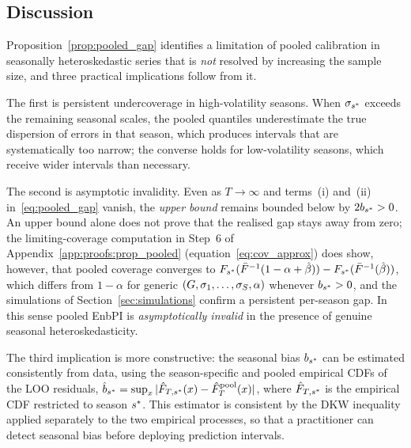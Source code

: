 \subsection{Discussion}
\label{sec:pooled_gap:discussion}

Proposition~\ref{prop:pooled_gap} identifies a limitation of pooled
calibration in seasonally heteroskedastic series that is \emph{not}
resolved by increasing the sample size, and three practical
implications follow from it.

The first is persistent undercoverage in high-volatility seasons.
When $\sigma_{s^*}$ exceeds the remaining seasonal scales, the
pooled quantiles underestimate the true dispersion of errors in that
season, which produces intervals that are systematically too narrow;
the converse holds for low-volatility seasons, which receive wider
intervals than necessary.

The second is asymptotic invalidity.  Even as $T \to \infty$ and
terms~(i) and~(ii) in~\eqref{eq:pooled_gap} vanish, the \emph{upper
bound} remains bounded below by $2b_{s^*} > 0$.  An upper bound alone
does not prove that the realised gap stays away from zero; the
limiting-coverage computation in Step~6 of
Appendix~\ref{app:proofs:prop_pooled}
(equation~\eqref{eq:cov_approx}) does show, however, that pooled
coverage converges to
$F_{s^*}(\bar{F}^{-1}(1-\alpha+\hat\beta))
 - F_{s^*}(\bar{F}^{-1}(\hat\beta))$,
which differs from $1-\alpha$ for generic
$(G, \sigma_1,\ldots,\sigma_S, \alpha)$ whenever
$b_{s^*} > 0$, and the simulations of
Section~\ref{sec:simulations} confirm a persistent per-season gap.
In this sense pooled EnbPI is \emph{asymptotically invalid} in the
presence of genuine seasonal heteroskedasticity.

The third implication is more constructive: the seasonal bias
$b_{s^*}$ can be estimated consistently from data, using the
season-specific and pooled empirical CDFs of the LOO residuals,
$\hat{b}_{s^*} = \sup_x |\hat{F}_{T,s^*}(x) - \hat{F}_T^{\text{pool}}(x)|$,
where $\hat{F}_{T,s^*}$ is the empirical CDF restricted to season
$s^*$.  This estimator is consistent by the DKW inequality applied
separately to the two empirical processes, so that a practitioner can
detect seasonal bias before deploying prediction intervals.
